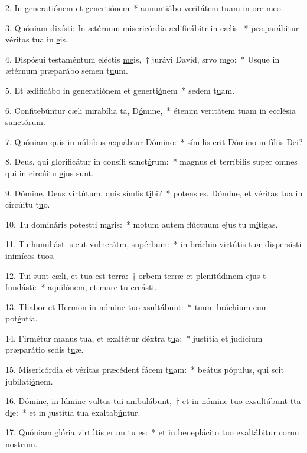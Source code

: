 2. In generatiónem et generti\uline{ó}nem~* annuntiábo veritátem tuam in ore m\uline{e}o.\par 
3. Quóniam dixísti: In ætérnum misericórdia ædificábitr in c\uline{æ}lis:~* præparábitur véritas tua in \uline{e}is.\par 
4. Dispósui testaméntum eléctis \uline{me}is,~† jurávi David, srvo m\uline{e}o:~* Usque in ætérnum præparábo semen t\uline{u}um.\par 
5. Et ædificábo in generatiónem et generti\uline{ó}nem~* sedem t\uline{u}am.\par 
6. Confitebúntur cæli mirabília ta, D\uline{ó}mine,~* étenim veritátem tuam in ecclésia sanct\uline{ó}rum.\par 
7. Quóniam quis in núbibus æquábtur D\uline{ó}mino:~* símilis erit Dómino in fíliis D\uline{e}i?\par 
8. Deus, qui glorificátur in consíli sanct\uline{ó}rum:~* magnus et terríbilis super omnes qui in circúitu \uline{e}jus sunt.\par 
9. Dómine, Deus virtútum, quis símlis t\uline{i}bi?~* potens es, Dómine, et véritas tua in circúitu t\uline{u}o.\par 
10. Tu domináris potestti m\uline{a}ris:~* motum autem flúctuum ejus tu m\uline{í}tigas.\par 
11. Tu humiliásti sicut vulnerátm, sup\uline{é}rbum:~* in bráchio virtútis tuæ dispersísti inimícos t\uline{u}os.\par 
12. Tui sunt cæli, et tua est \uline{ter}ra:~† orbem terræ et plenitúdinem ejus t fund\uline{á}sti:~* aquilónem, et mare tu cre\uline{á}sti.\par 
13. Thabor et Hermon in nómine tuo xsult\uline{á}bunt:~* tuum bráchium cum pot\uline{é}ntia.\par 
14. Firmétur manus tua, et exaltétur déxtra t\uline{u}a:~* justítia et judícium præparátio sedis t\uline{u}æ.\par 
15. Misericórdia et véritas præcédent fácem t\uline{u}am:~* beátus pópulus, qui scit jubilati\uline{ó}nem.\par 
16. Dómine, in lúmine vultus tui ambu\uline{lá}bunt,~† et in nómine tuo exsultábunt tta d\uline{i}e:~* et in justítia tua exaltab\uline{ú}ntur.\par 
17. Quóniam glória virtútis erum t\uline{u} es:~* et in beneplácito tuo exaltábitur cornu n\uline{o}strum.\par 
